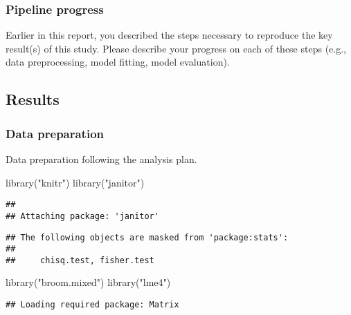 \documentclass[
]{article}
\newenvironment{Shaded}{\begin{snugshade}}{\end{snugshade}}
\newcommand{\FunctionTok}[1]{\textcolor[rgb]{0.00,0.00,0.00}{#1}}
\newcommand{\NormalTok}[1]{#1}
\newcommand{\StringTok}[1]{\textcolor[rgb]{0.31,0.60,0.02}{#1}}
\begin{document}
\hypertarget{pipeline-progress}{%
\subsubsection{Pipeline progress}\label{pipeline-progress}}

Earlier in this report, you described the steps necessary to reproduce
the key result(s) of this study. Please describe your progress on each
of these steps (e.g., data preprocessing, model fitting, model
evaluation).

\hypertarget{results}{%
\subsection{Results}\label{results}}

\hypertarget{data-preparation}{%
\subsubsection{Data preparation}\label{data-preparation}}

Data preparation following the analysis plan.

\begin{Shaded}
\begin{Highlighting}[]
\FunctionTok{library}\NormalTok{(}\StringTok{"knitr"}\NormalTok{)}
\FunctionTok{library}\NormalTok{(}\StringTok{"janitor"}\NormalTok{)     }
\end{Highlighting}
\end{Shaded}

\begin{verbatim}
## 
## Attaching package: 'janitor'
\end{verbatim}

\begin{verbatim}
## The following objects are masked from 'package:stats':
## 
##     chisq.test, fisher.test
\end{verbatim}

\begin{Shaded}
\begin{Highlighting}[]
\FunctionTok{library}\NormalTok{(}\StringTok{"broom.mixed"}\NormalTok{) }
\FunctionTok{library}\NormalTok{(}\StringTok{"lme4"}\NormalTok{)}
\end{Highlighting}
\end{Shaded}

\begin{verbatim}
## Loading required package: Matrix
\end{verbatim}
\end{document}
